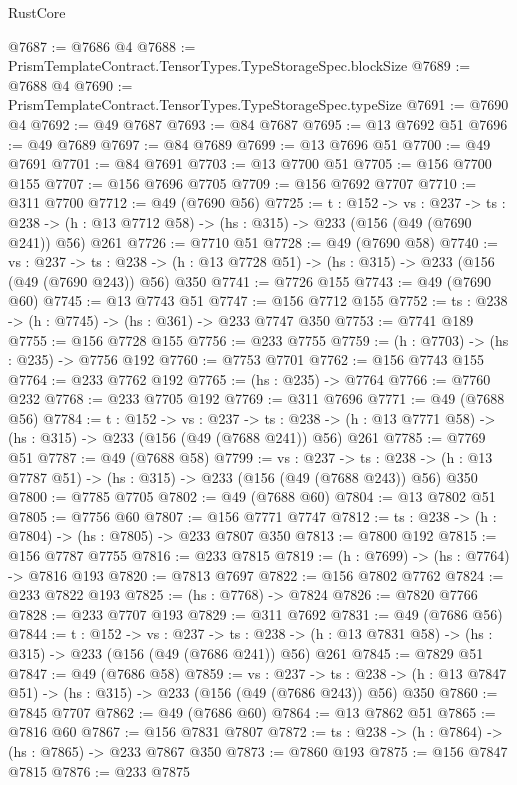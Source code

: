 \begin{lexlean}{RustCore}
\begin{coremodule}
@7687 := @7686 @4
@7688 := PrismTemplateContract.TensorTypes.TypeStorageSpec.blockSize
@7689 := @7688 @4
@7690 := PrismTemplateContract.TensorTypes.TypeStorageSpec.typeSize
@7691 := @7690 @4
@7692 := @49 @7687
@7693 := @84 @7687
@7695 := @13 @7692 @51
@7696 := @49 @7689
@7697 := @84 @7689
@7699 := @13 @7696 @51
@7700 := @49 @7691
@7701 := @84 @7691
@7703 := @13 @7700 @51
@7705 := @156 @7700 @155
@7707 := @156 @7696 @7705
@7709 := @156 @7692 @7707
@7710 := @311 @7700
@7712 := @49 (@7690 @56)
@7725 := {t : @152} ->
  {vs : @237} ->
  {ts : @238} -> (h : @13 @7712 @58) -> (hs : @315) -> @233 (@156 (@49 (@7690 @241)) @56) @261
@7726 := @7710 @51
@7728 := @49 (@7690 @58)
@7740 := {vs : @237} ->
  {ts : @238} -> (h : @13 @7728 @51) -> (hs : @315) -> @233 (@156 (@49 (@7690 @243)) @56) @350
@7741 := @7726 @155
@7743 := @49 (@7690 @60)
@7745 := @13 @7743 @51
@7747 := @156 @7712 @155
@7752 := {ts : @238} -> (h : @7745) -> (hs : @361) -> @233 @7747 @350
@7753 := @7741 @189
@7755 := @156 @7728 @155
@7756 := @233 @7755
@7759 := (h : @7703) -> (hs : @235) -> @7756 @192
@7760 := @7753 @7701
@7762 := @156 @7743 @155
@7764 := @233 @7762 @192
@7765 := (hs : @235) -> @7764
@7766 := @7760 @232
@7768 := @233 @7705 @192
@7769 := @311 @7696
@7771 := @49 (@7688 @56)
@7784 := {t : @152} ->
  {vs : @237} ->
  {ts : @238} -> (h : @13 @7771 @58) -> (hs : @315) -> @233 (@156 (@49 (@7688 @241)) @56) @261
@7785 := @7769 @51
@7787 := @49 (@7688 @58)
@7799 := {vs : @237} ->
  {ts : @238} -> (h : @13 @7787 @51) -> (hs : @315) -> @233 (@156 (@49 (@7688 @243)) @56) @350
@7800 := @7785 @7705
@7802 := @49 (@7688 @60)
@7804 := @13 @7802 @51
@7805 := @7756 @60
@7807 := @156 @7771 @7747
@7812 := {ts : @238} -> (h : @7804) -> (hs : @7805) -> @233 @7807 @350
@7813 := @7800 @192
@7815 := @156 @7787 @7755
@7816 := @233 @7815
@7819 := (h : @7699) -> (hs : @7764) -> @7816 @193
@7820 := @7813 @7697
@7822 := @156 @7802 @7762
@7824 := @233 @7822 @193
@7825 := (hs : @7768) -> @7824
@7826 := @7820 @7766
@7828 := @233 @7707 @193
@7829 := @311 @7692
@7831 := @49 (@7686 @56)
@7844 := {t : @152} ->
  {vs : @237} ->
  {ts : @238} -> (h : @13 @7831 @58) -> (hs : @315) -> @233 (@156 (@49 (@7686 @241)) @56) @261
@7845 := @7829 @51
@7847 := @49 (@7686 @58)
@7859 := {vs : @237} ->
  {ts : @238} -> (h : @13 @7847 @51) -> (hs : @315) -> @233 (@156 (@49 (@7686 @243)) @56) @350
@7860 := @7845 @7707
@7862 := @49 (@7686 @60)
@7864 := @13 @7862 @51
@7865 := @7816 @60
@7867 := @156 @7831 @7807
@7872 := {ts : @238} -> (h : @7864) -> (hs : @7865) -> @233 @7867 @350
@7873 := @7860 @193
@7875 := @156 @7847 @7815
@7876 := @233 @7875

\end{coremodule}
\end{lexlean}
